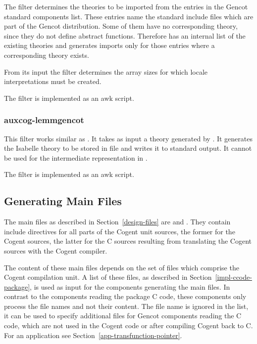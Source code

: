 The filter determines the theories to be imported from the entries  in the Gencot standard
components list. These entries name the standard include files which are part of the Gencot distribution. Some
of them have no corresponding theory, since they do not define abstract functions. Therefore 
has an internal list of the existing theories and generates imports only for those entries where a corresponding 
theory exists.

From its input the filter determines the array sizes for which locale interpretations must be created.

The filter is implemented as an awk script.

\subsubsection{auxcog-lemmgencot}

This filter works similar as . It takes as input a theory generated by . 
It generates the Isabelle theory to be stored in file 
 and writes it to standard output. It cannot be used for the intermediate
representation in .

The filter is implemented as an awk script.

\subsection{Generating Main Files}
\label{impl-ocomps-main}

The main files as described in Section~\ref{design-files} are  and . They
contain include directives for all parts of the Cogent unit sources, the former for the Cogent sources, the latter 
for the C sources resulting from translating the Cogent sources with the Cogent compiler.

The content of these main files depends on the set of  files which comprise the Cogent compilation unit.
A list of these files, as described in Section~\ref{impl-ccode-package}, is used as input for the components generating
the main files. In contrast to the components reading the package C code, these components only process the file 
names and not their content. The file name  is ignored in the list, it can be used
to specify additional  files for Gencot components reading the C code, which are not used in the Cogent 
code or after compiling Cogent back to C. For an application see Section~\ref{app-transfunction-pointer}.

